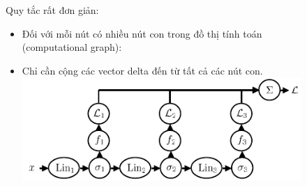 \documentclass{book}
\begin{document}
\begin{figure}[H]
\begin{minipage}[c]{0.45\textwidth}
\begin{figure}[H]
        \end{figure}
    \end{minipage}\hfill
    \begin{minipage}[c]{0.45\textwidth}
        Quy tắc rất đơn giản:
        \begin{itemize}
            \item Đối với mỗi nút có nhiều nút con trong đồ thị tính toán (computational graph):
            \item Chỉ cần cộng các vector delta đến từ tất cả các nút con.
            \includegraphics[width=\textwidth]{images/graph_structure_backpropagation_2.png}
        \end{itemize}
    \end{minipage}
\end{figure}
\end{document}

